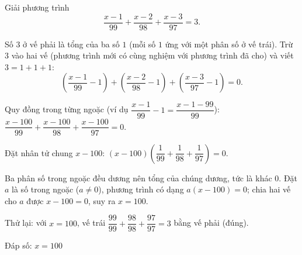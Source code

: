 \begin{problem}[8DS-PT1-051]
Giải phương trình
\[ \dfrac{x - 1}{99} + \dfrac{x - 2}{98} + \dfrac{x - 3}{97} = 3. \]

\begin{solution}
Số $3$ ở vế phải là tổng của ba số $1$ (mỗi số $1$ ứng với một phân số ở vế trái). Trừ $3$ vào hai vế (phương trình mới có cùng nghiệm với phương trình đã cho) và viết $3 = 1 + 1 + 1$:
\[ \left(\dfrac{x - 1}{99} - 1\right) + \left(\dfrac{x - 2}{98} - 1\right) + \left(\dfrac{x - 3}{97} - 1\right) = 0. \]

Quy đồng trong từng ngoặc (ví dụ $\dfrac{x - 1}{99} - 1 = \dfrac{x - 1 - 99}{99}$): $\dfrac{x - 100}{99} + \dfrac{x - 100}{98} + \dfrac{x - 100}{97} = 0$.

Đặt nhân tử chung $x - 100$: $(x - 100)\left(\dfrac{1}{99} + \dfrac{1}{98} + \dfrac{1}{97}\right) = 0$.

Ba phân số trong ngoặc đều dương nên tổng của chúng dương, tức là khác $0$. Đặt $a$ là số trong ngoặc ($a \neq 0$), phương trình có dạng $a(x - 100) = 0$; chia hai vế cho $a$ được $x - 100 = 0$, suy ra $x = 100$.

Thử lại: với $x = 100$, vế trái $\dfrac{99}{99} + \dfrac{98}{98} + \dfrac{97}{97} = 3$ bằng vế phải (đúng).

Đáp số: $\boxed{x = 100}$
\end{solution}
\end{problem}


